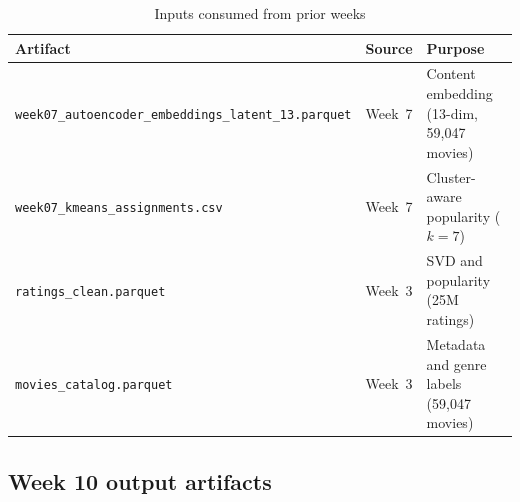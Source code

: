 \documentclass[12pt,a4paper]{article}
\begin{document}
\begin{table}[H]
\centering
\caption{Inputs consumed from prior weeks}
\begin{tabular}{lll}
\toprule
\textbf{Artifact} & \textbf{Source} & \textbf{Purpose} \\
\midrule
\texttt{week07\_autoencoder\_embeddings\_latent\_13.parquet} & Week~7 & Content embedding (13-dim, 59,047 movies) \\
\texttt{week07\_kmeans\_assignments.csv} & Week~7 & Cluster-aware popularity ($k=7$) \\
\texttt{ratings\_clean.parquet} & Week~3 & SVD and popularity (25M ratings) \\
\texttt{movies\_catalog.parquet} & Week~3 & Metadata and genre labels (59,047 movies) \\
\bottomrule
\end{tabular}
\end{table}

\subsection{Week 10 output artifacts}
\end{document}

